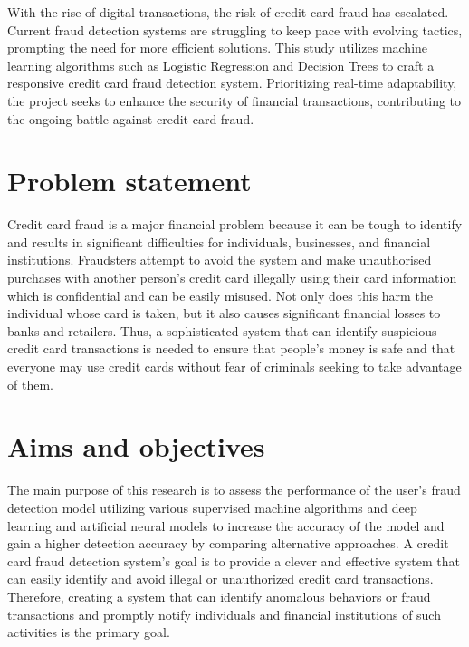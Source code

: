 With the rise of digital transactions, the risk of credit card fraud has escalated. Current 
fraud detection systems are struggling to keep pace with evolving tactics, prompting 
the need for more efficient solutions. This study utilizes machine learning algorithms such as 
Logistic Regression and Decision Trees to craft a responsive credit card fraud 
detection system. Prioritizing real-time adaptability, the project seeks to enhance the 
security of financial transactions, contributing to the ongoing battle against credit card 
fraud.

\section{Problem statement}
\label{sec:intro_prob_art}
Credit card fraud is a major financial problem because it can be tough to identify and results in significant difficulties for individuals, businesses, and financial institutions. Fraudsters attempt to avoid the system and make unauthorised purchases with another person's credit card illegally using their card information which is confidential and can be easily misused. Not only does this harm the individual whose card is taken, but it also causes significant financial losses to banks and retailers. Thus, a sophisticated system that can identify suspicious credit card transactions is needed to ensure that people's money is safe and that everyone may use credit cards without fear of criminals seeking to take advantage of them.

\section{Aims and objectives}
\label{sec:intro_aims_obj}

The main purpose of this research is to assess the performance of the user's fraud detection model utilizing various supervised machine algorithms and deep learning and artificial neural models to increase the accuracy of the model and gain a higher detection accuracy by comparing alternative approaches. A credit card fraud detection system's goal is to provide a clever and effective system that can easily identify and avoid illegal or unauthorized credit card transactions. Therefore, creating a system that can identify anomalous behaviors or fraud transactions and promptly notify individuals and financial institutions of such activities is the primary goal.



